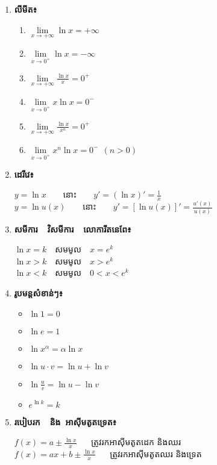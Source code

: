\documentclass[12pt, a4paper]{article}
\begin{document}
\begin{enumerate}[m]
	\item \textbf{\sffamily លីមីត៖}
	\begin{enumerate}[k,2]
		\item $\lim\limits_{x\to+\infty}\ln x=+\infty$
		\item $\lim\limits_{x\to 0^+}\ln x=-\infty$
		\item $\lim\limits_{x\to+\infty}\frac{\ln x}{x}=0^+$		
		\item $\lim\limits_{x\to0^+}x\ln x=0^-$
		\item $\lim\limits_{x\to+\infty}\frac{\ln x}{x^n}=0^+$
		\item $\lim\limits_{x\to0^+}x^n\ln x=0^-~~(n>0)$
	\end{enumerate}
	\item \textbf{\sffamily ដេរីវេ៖}
	\begin{center}
		$y=\ln x$~~~~នោះ~~~~$y'=(\ln x)'=\frac{1}{x}$\\
		$y=\ln u(x)$~~~~នោះ~~~~$y'=[\ln u(x)]'=\frac{u'(x)}{u(x)}$
	\end{center}
	\item \textbf{\sffamily សមីការ~~វិសមីការ~~លោការីតនេពែ៖}
	\begin{center}
		$\ln x=k$~~សមមូល~~$x=e^k$\\
		$\ln x>k$~~សមមូល~~$x>e^k$\\
		$\ln x<k$~~សមមូល~~$0<x<e^k$
	\end{center}
	\item \textbf{\sffamily រូបមន្តសំខាន់ៗ៖}
	\begin{multicols}{3}
		\begin{itemize}
			\item $\ln1=0$				
			\item $\ln e=1$
			\item $\ln x^\alpha=\alpha\ln x$ 
			\item $\ln u\cdot v=\ln u+\ln v$
			\item $\ln \frac{u}{v}=\ln u-\ln v$
			\item $e^{\ln k} =k$
		\end{itemize}
	\end{multicols}\newpage
	\item \textbf{\sffamily របៀបរក~~និង~អាស៊ីមតូតទ្រេត៖}
	\begin{center}
		$f(x)=a\pm \frac{\ln x}{x}$ ~~ ត្រូវរកអាស៊ីមតូតដេក និងឈរ\\
		$f(x)=ax+b\pm \frac{\ln x}{x}$ ~~ ត្រូវរកអាស៊ីមតូតឈរ និងទ្រេត
	\end{center}

\end{enumerate}
\end{document}
